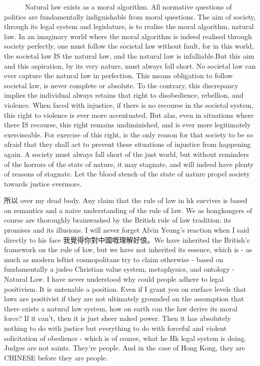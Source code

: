  
 
 
 Natural law exists as a moral algorithm. All normative questions of politics are fundamentally indiguishable from moral questions. The aim of society, through its legal system and legislature, is to realise the moral algorithm, natural law. In an imaginary world where the moral algorithm is indeed realised through society perfectly, one must follow the societal law without fault, for in this world, the societal law IS the natural law, and the natural law is infalliable.But this aim and this aspiration, by its very nature, must always fall short. No societal law can ever capture the natural law in perfection. This means obligation to follow societal law, is never complete or absolute. To the contrary, this discrepancy implies the individual always retains that right to disobedience, rebellion, and violence. When faced with injustice, if there is no recourse in the societal system, this right to violence is ever more accentuated. But alas, even in situations where there IS recourse, this right remains undiminished, and is ever more legitimately exerciseable. For exercise of this right, is the only reason for that society to be so afraid that they shall act to prevent these situations of injustice from happening again. A society must always fall short of the just world, but without reminders of the horrors of the state of nature, it may stagnate, and will indeed have plenty of reasons of stagnate. Let the blood stench of the state of nature propel society towards justice evermore. 




所以 over my dead body. 
Any claim that the rule of law in hk survives is based on semantics and a naive understanding of the rule of law. We as hongkongers of course are thoroughly brainwashed by the British rule of law tradition: its promises and its illusions. I will never forget Alvin Yeung’s reaction when I said directly to his face 我覺得你對中國嘅理解好俍。We have inherited the British’s framework on the rule of law, but we have not inherited its essence, which is - as much as modern leftist cosmopolitans try to claim otherwise - based on fundamentally a judeo Christian value system, metaphysics, and ontology - Natural Law. I have never understood why could people adhere to legal positivism. It is untenable a position. Even if I grant you on surface levels that laws are positivist if they are not ultimately grounded on the assumption that there exists a natural law system, how on earth can the law derive its moral force? If it can’t, then it is just sheer naked power. Then it has absolutely nothing to do with justice but everything to do with forceful and violent solicitation of obedience - which is of course, what he Hk legal system is doing. Judges are not saints. They’re people. And in the case of Hong Kong, they are CHINESE before they are people. 






